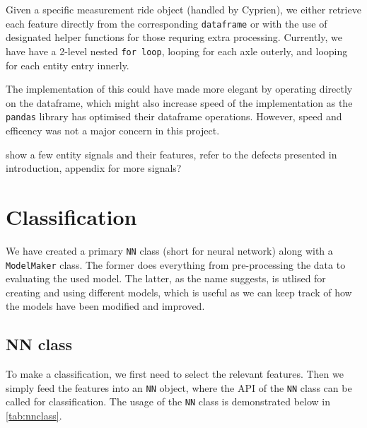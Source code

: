 Given a specific measurement ride object (handled by Cyprien), we either retrieve each feature directly from the corresponding \verb|dataframe| or with the use of designated helper functions for those requring extra processing. Currently, we have have a 2-level nested \verb|for loop|, looping for each axle outerly, and looping for each entity entry innerly.

The implementation of this could have made more elegant by operating directly on the dataframe, which might also increase speed of the implementation as the \verb|pandas| library has optimised their dataframe operations. However, speed and efficency was not a major concern in this project.

show a few entity signals and their features, refer to the defects presented in introduction,  appendix for more signals? \todo{}

\section{Classification}
We have created a primary \verb|NN| class (short for neural network) along with a \verb|ModelMaker| class. The former does everything from pre-processing the data to evaluating the used model. The latter, as the name suggests, is utlised for creating and using different models, which is useful as we can keep track of how the models have been modified and improved. 

\subsection{NN class}
To make a classification, we first need to select the relevant features. Then we simply feed the features into an \verb|NN| object, where the API of the \verb|NN| class can be called for classification. The usage of the \verb|NN| class is demonstrated below in \ref{tab:nnclass}.


